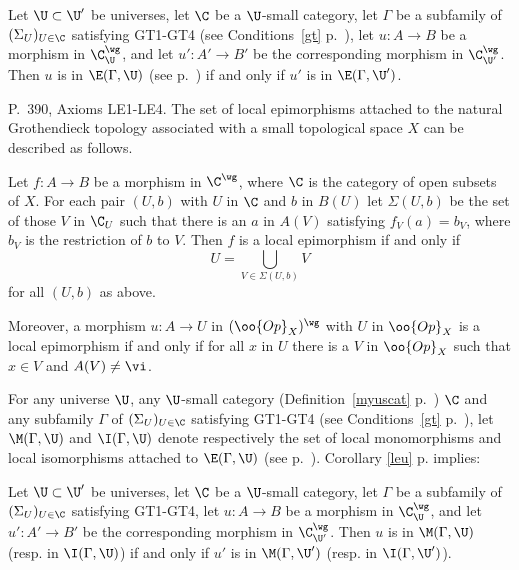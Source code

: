 \documentclass[12pt]{article}
\theoremstyle{remark}
\theoremstyle{definition}
\begin{document}
\begin{cor}
Let $\U\subset\U'$ be universes, let $\C$ be a $\U$-small category, let $\Gamma$ be a subfamily of $(\Sigma_U)_{U\in\C}$ satisfying GT1-GT4 (see Conditions~\ref{gt} p.~), let $u:A\to B$ be a morphism in $\C^\wg_\U$, and let $u':A'\to B'$ be the corresponding morphism in $\C^\wg_{\U'}$. Then $u$ is in $\E(\Gamma,\U)$ (see  p.~) if and only if $u'$ is in $\E(\Gamma,\U')$.
\end{cor}



\begin{s}
P.~390, Axioms LE1-LE4. The set of local epimorphisms attached to the natural Grothendieck topology associated with a small topological space $X$ can be described as follows. 

Let $f:A\to B$ be a morphism in $\C^\wg$, where $\C$ is the category of open subsets of $X$. For each pair $(U,b)$ with $U$ in $\C$ and $b$ in $B(U)$ let $\Sigma(U,b)$ be the set of those $V$ in $\C_U$ such that there is an $a$ in $A(V)$ satisfying $f_V(a)=b_V$, where $b_V$ is the restriction of $b$ to $V$. Then $f$ is a local epimorphism if and only if 
$$
U=\bigcup_{V\in\Sigma(U,b)}V
$$ 
for all $(U,b)$ as above.

Moreover, a morphism $u:A\to U$ in $(\oo{Op}_X)^\wg$ with $U$ in $\oo{Op}_X$ is a local epimorphism if and only if for all $x$ in $U$ there is a $V$ in $\oo{Op}_X$ such that $x\in V$ and $A(V)\ne\vi$. 
\end{s}


\begin{s}
For any universe $\U$, any $\U$-small category (Definition~\ref{myuscat} p.~) $\C$ and any subfamily $\Gamma$ of $(\Sigma_U)_{U\in\C}$ satisfying GT1-GT4 (see Conditions~\ref{gt} p.~), let $\M(\Gamma,\U)$ and $\I(\Gamma,\U)$ denote respectively the set of local monomorphisms and local isomorphisms attached to $\E(\Gamma,\U)$ (see  p.~). Corollary \ref{leu} p.  implies:

Let $\U\subset\U'$ be universes, let $\C$ be a $\U$-small category, let $\Gamma$ be a subfamily of $(\Sigma_U)_{U\in\C}$ satisfying GT1-GT4, let $u:A\to B$ be a morphism in $\C^\wg_\U$, and let $u':A'\to B'$ be the corresponding morphism in $\C^\wg_{\U'}$. Then $u$ is in $\M(\Gamma,\U)$ (resp. in $\I(\Gamma,\U)$) if and only if $u'$ is in $\M(\Gamma,\U')$ (resp. in $\I(\Gamma,\U')$).
\end{s}
\end{document}
